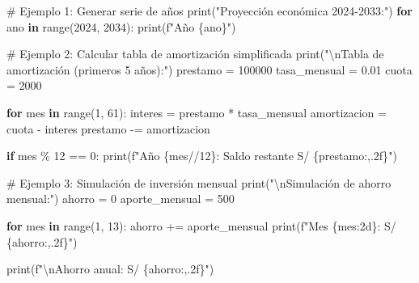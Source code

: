 \documentclass[
  doc,
  floatsintext,
  longtable,
  a4paper,
  nolmodern,
  notxfonts,
  notimes,
  12pt,
  colorlinks=true,linkcolor=blue,citecolor=blue,urlcolor=blue]{apa7}
\newenvironment{Shaded}{\begin{snugshade}}{\end{snugshade}}
\newcommand{\BuiltInTok}[1]{\textcolor[rgb]{0.00,0.23,0.31}{#1}}
\newcommand{\CharTok}[1]{\textcolor[rgb]{0.13,0.47,0.30}{#1}}
\newcommand{\CommentTok}[1]{\textcolor[rgb]{0.37,0.37,0.37}{#1}}
\newcommand{\ControlFlowTok}[1]{\textcolor[rgb]{0.00,0.23,0.31}{\textbf{#1}}}
\newcommand{\DecValTok}[1]{\textcolor[rgb]{0.68,0.00,0.00}{#1}}
\newcommand{\FloatTok}[1]{\textcolor[rgb]{0.68,0.00,0.00}{#1}}
\newcommand{\KeywordTok}[1]{\textcolor[rgb]{0.00,0.23,0.31}{\textbf{#1}}}
\newcommand{\NormalTok}[1]{\textcolor[rgb]{0.00,0.23,0.31}{#1}}
\newcommand{\OperatorTok}[1]{\textcolor[rgb]{0.37,0.37,0.37}{#1}}
\newcommand{\SpecialCharTok}[1]{\textcolor[rgb]{0.37,0.37,0.37}{#1}}
\newcommand{\SpecialStringTok}[1]{\textcolor[rgb]{0.13,0.47,0.30}{#1}}
\newcommand{\StringTok}[1]{\textcolor[rgb]{0.13,0.47,0.30}{#1}}
\begin{document}
\begin{Shaded}
\begin{Highlighting}[]
\CommentTok{\# Ejemplo 1: Generar serie de años}
\BuiltInTok{print}\NormalTok{(}\StringTok{"Proyección económica 2024{-}2033:"}\NormalTok{)}
\ControlFlowTok{for}\NormalTok{ ano }\KeywordTok{in} \BuiltInTok{range}\NormalTok{(}\DecValTok{2024}\NormalTok{, }\DecValTok{2034}\NormalTok{):}
    \BuiltInTok{print}\NormalTok{(}\SpecialStringTok{f"Año }\SpecialCharTok{\{}\NormalTok{ano}\SpecialCharTok{\}}\SpecialStringTok{"}\NormalTok{)}

\CommentTok{\# Ejemplo 2: Calcular tabla de amortización simplificada}
\BuiltInTok{print}\NormalTok{(}\StringTok{"}\CharTok{\textbackslash{}n}\StringTok{Tabla de amortización (primeros 5 años):"}\NormalTok{)}
\NormalTok{prestamo }\OperatorTok{=} \DecValTok{100000}
\NormalTok{tasa\_mensual }\OperatorTok{=} \FloatTok{0.01}
\NormalTok{cuota }\OperatorTok{=} \DecValTok{2000}

\ControlFlowTok{for}\NormalTok{ mes }\KeywordTok{in} \BuiltInTok{range}\NormalTok{(}\DecValTok{1}\NormalTok{, }\DecValTok{61}\NormalTok{):}
\NormalTok{    interes }\OperatorTok{=}\NormalTok{ prestamo }\OperatorTok{*}\NormalTok{ tasa\_mensual}
\NormalTok{    amortizacion }\OperatorTok{=}\NormalTok{ cuota }\OperatorTok{{-}}\NormalTok{ interes}
\NormalTok{    prestamo }\OperatorTok{{-}=}\NormalTok{ amortizacion}
    
    \ControlFlowTok{if}\NormalTok{ mes }\OperatorTok{\%} \DecValTok{12} \OperatorTok{==} \DecValTok{0}\NormalTok{:}
        \BuiltInTok{print}\NormalTok{(}\SpecialStringTok{f"Año }\SpecialCharTok{\{}\NormalTok{mes}\OperatorTok{//}\DecValTok{12}\SpecialCharTok{\}}\SpecialStringTok{: Saldo restante S/ }\SpecialCharTok{\{}\NormalTok{prestamo}\SpecialCharTok{:,.2f\}}\SpecialStringTok{"}\NormalTok{)}

\CommentTok{\# Ejemplo 3: Simulación de inversión mensual}
\BuiltInTok{print}\NormalTok{(}\StringTok{"}\CharTok{\textbackslash{}n}\StringTok{Simulación de ahorro mensual:"}\NormalTok{)}
\NormalTok{ahorro }\OperatorTok{=} \DecValTok{0}
\NormalTok{aporte\_mensual }\OperatorTok{=} \DecValTok{500}

\ControlFlowTok{for}\NormalTok{ mes }\KeywordTok{in} \BuiltInTok{range}\NormalTok{(}\DecValTok{1}\NormalTok{, }\DecValTok{13}\NormalTok{):}
\NormalTok{    ahorro }\OperatorTok{+=}\NormalTok{ aporte\_mensual}
    \BuiltInTok{print}\NormalTok{(}\SpecialStringTok{f"Mes }\SpecialCharTok{\{}\NormalTok{mes}\SpecialCharTok{:2d\}}\SpecialStringTok{: S/ }\SpecialCharTok{\{}\NormalTok{ahorro}\SpecialCharTok{:,.2f\}}\SpecialStringTok{"}\NormalTok{)}

\BuiltInTok{print}\NormalTok{(}\SpecialStringTok{f"}\CharTok{\textbackslash{}n}\SpecialStringTok{Ahorro anual: S/ }\SpecialCharTok{\{}\NormalTok{ahorro}\SpecialCharTok{:,.2f\}}\SpecialStringTok{"}\NormalTok{)}
\end{Highlighting}
\end{Shaded}
\end{document}
